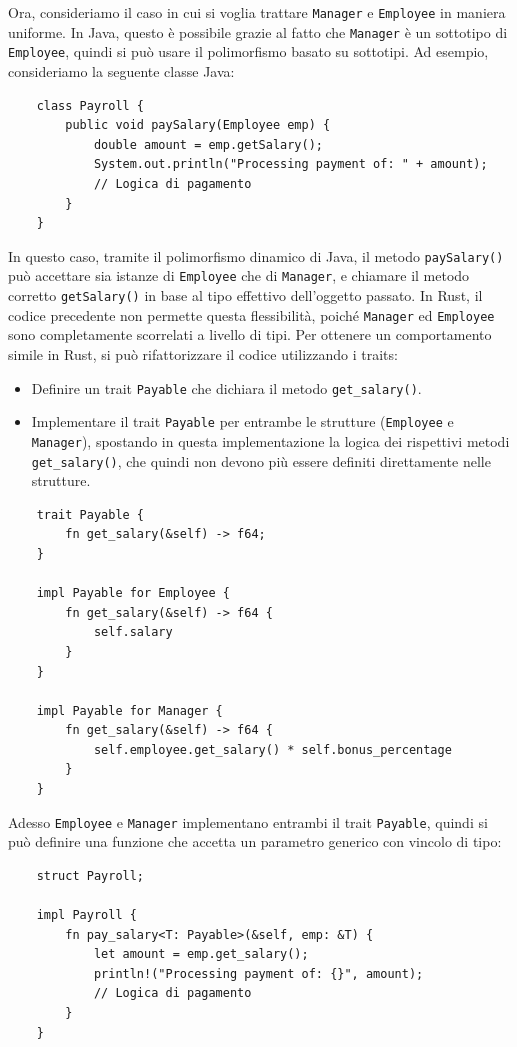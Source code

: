 Ora, consideriamo il caso in cui si voglia trattare \texttt{Manager} e \texttt{Employee} in maniera uniforme. In Java, questo è possibile grazie al fatto che \texttt{Manager} è un sottotipo di \texttt{Employee}, quindi si può usare il polimorfismo basato su sottotipi. Ad esempio, consideriamo la seguente classe Java:
\begin{verbatim}
    class Payroll {
        public void paySalary(Employee emp) {
            double amount = emp.getSalary();
            System.out.println("Processing payment of: " + amount);
            // Logica di pagamento
        }
    }
\end{verbatim}
In questo caso, tramite il polimorfismo dinamico di Java, il metodo \texttt{paySalary()} può accettare sia istanze di \texttt{Employee} che di \texttt{Manager}, e chiamare il metodo corretto \texttt{getSalary()} in base al tipo effettivo dell'oggetto passato. In Rust, il codice precedente non permette questa flessibilità, poiché \texttt{Manager} ed \texttt{Employee} sono completamente scorrelati a livello di tipi. Per ottenere un comportamento simile in Rust, si può rifattorizzare il codice utilizzando i traits:
\begin{itemize}
    \item Definire un trait \texttt{Payable} che dichiara il metodo \texttt{get\_salary()}.
    \item Implementare il trait \texttt{Payable} per entrambe le strutture (\texttt{Employee} e \texttt{Manager}), spostando in questa implementazione la logica dei rispettivi metodi \texttt{get\_salary()}, che quindi non devono più essere definiti direttamente nelle strutture.
\end{itemize}
\begin{verbatim}
    trait Payable {
        fn get_salary(&self) -> f64;
    }

    impl Payable for Employee {
        fn get_salary(&self) -> f64 {
            self.salary
        }
    }

    impl Payable for Manager {
        fn get_salary(&self) -> f64 {
            self.employee.get_salary() * self.bonus_percentage
        }
    }
\end{verbatim}
Adesso \texttt{Employee} e \texttt{Manager} implementano entrambi il trait \texttt{Payable}, quindi si può definire una funzione che accetta un parametro generico con vincolo di tipo:
\begin{verbatim}
    struct Payroll;

    impl Payroll {
        fn pay_salary<T: Payable>(&self, emp: &T) {
            let amount = emp.get_salary();
            println!("Processing payment of: {}", amount);
            // Logica di pagamento
        }
    }
\end{verbatim}
